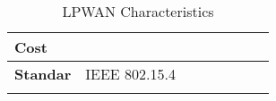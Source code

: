 \begin{longtable}{l|l|l|l|l|l|l|l}
	\bf{Cost}                          & \                &              &              &             &             &                 &                 \\\hline
	\bf{Standar}                       & IEEE 802.15.4    &              &              &             &             &                 &                 \\\hline

\caption{\label{tab:LPWan_characteristics} LPWAN Characteristics \cite{berder_reseaux_2014}}
\end{longtable}


